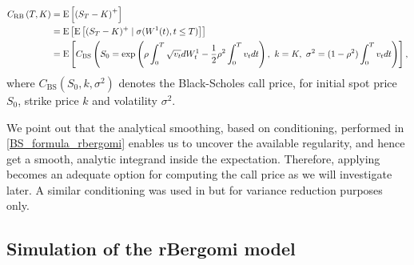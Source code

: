 \begin{align}\label{BS_formula_rbergomi}
	C_{\text{RB}}\left( T, K \right) &= \text{E}\left[ \left(S_T - K \right)^+ \right]  \nonumber\\
	&=\mathrm{E}\left[\mathrm{E}\left[(S_T-K)^+ \mid \sigma(W^1(t) ,t \le T)\right]\right]\nonumber \\
	&=\text{E}\left[C_{\text{BS}}\left( S_0 = \operatorname{exp}\left(\rho \int_0^T \sqrt{v_t} dW_t^1 - \frac{1}{2}
	\rho^2 \int_0^T v_t dt\right),\ k = K, \ \sigma^2 = (1-\rho^2)
	\int_0^T v_t dt \right) \right],
\end{align}
where $C_{\text{BS}}(S_0,k,\sigma^2)$ denotes the Black-Scholes call price, for initial spot price $S_0$, strike price $k$ and volatility $\sigma^2$.


We point out that the analytical smoothing, based on conditioning, performed in \eqref{BS_formula_rbergomi} enables us to uncover the available regularity, and hence  get a smooth, analytic integrand inside the expectation. Therefore, applying  becomes an adequate option for computing the call price as we will investigate later. A similar conditioning was used in \cite{mccrickerd2018turbocharging} but for variance reduction purposes only.

\subsection{Simulation of the rBergomi model}\label{sec:Simulation of the rBergomi model}

